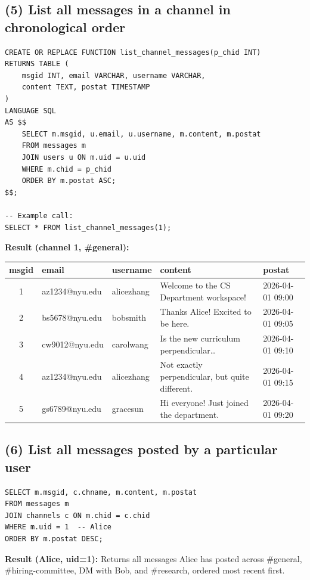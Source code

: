 \documentclass[11pt]{article}
\begin{document}
\subsection{(5) List all messages in a channel in chronological order}

\begin{lstlisting}
CREATE OR REPLACE FUNCTION list_channel_messages(p_chid INT)
RETURNS TABLE (
    msgid INT, email VARCHAR, username VARCHAR,
    content TEXT, postat TIMESTAMP
)
LANGUAGE SQL
AS $$
    SELECT m.msgid, u.email, u.username, m.content, m.postat
    FROM messages m
    JOIN users u ON m.uid = u.uid
    WHERE m.chid = p_chid
    ORDER BY m.postat ASC;
$$;

-- Example call:
SELECT * FROM list_channel_messages(1);
\end{lstlisting}

\noindent\textbf{Result (channel 1, \#general):}
\begin{center}
\tiny
\begin{tabular}{cllll}
\toprule
msgid & email & username & content & postat \\
\midrule
1 & az1234@nyu.edu & alicezhang & Welcome to the CS Department workspace! & 2026-04-01 09:00 \\
2 & bs5678@nyu.edu & bobsmith & Thanks Alice! Excited to be here. & 2026-04-01 09:05 \\
3 & cw9012@nyu.edu & carolwang & Is the new curriculum perpendicular\ldots & 2026-04-01 09:10 \\
4 & az1234@nyu.edu & alicezhang & Not exactly perpendicular, but quite different. & 2026-04-01 09:15 \\
5 & gs6789@nyu.edu & gracesun & Hi everyone! Just joined the department. & 2026-04-01 09:20 \\
\bottomrule
\end{tabular}
\end{center}

\newpage
\subsection{(6) List all messages posted by a particular user}

\begin{lstlisting}
SELECT m.msgid, c.chname, m.content, m.postat
FROM messages m
JOIN channels c ON m.chid = c.chid
WHERE m.uid = 1  -- Alice
ORDER BY m.postat DESC;
\end{lstlisting}

\noindent\textbf{Result (Alice, uid=1):} Returns all messages Alice has posted across \#general, \#hiring-committee, DM with Bob, and \#research, ordered most recent first.
\end{document}
